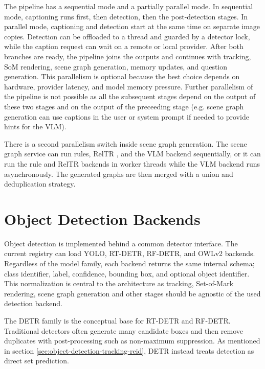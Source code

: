 The pipeline has a sequential mode and a partially parallel mode. In sequential mode, captioning runs first, then detection, then the post-detection stages. In parallel mode, captioning and detection start at the same time on separate image copies. Detection can be offloaded to a thread and guarded by a detector lock, while the caption request can wait on a remote or local provider. After both branches are ready, the pipeline joins the outputs and continues with tracking, SoM rendering, scene graph generation, memory updates, and question generation. This parallelism is optional because the best choice depends on hardware, provider latency, and model memory pressure. Further parallelism of the pipeline is not possible as all the subsequent stages depend on the output of these two stages and on the output of the preceeding stage (e.g. scene graph generation can use captions in the user or system prompt if needed to provide hints for the VLM).

There is a second parallelism switch inside scene graph generation. The scene graph service can run rules, RelTR \cite{cong_reltr_2023}, and the VLM backend sequentially, or it can run the rule and RelTR backends in worker threads while the VLM backend runs asynchronously. The generated graphs are then merged with a union and deduplication strategy. %

\section{Object Detection Backends}\label{sec:server-detection-backends}

Object detection is implemented behind a common detector interface. The current registry can load YOLO, RT-DETR, RF-DETR, and OWLv2 backends. Regardless of the model family, each backend returns the same internal schema; class identifier, label, confidence, bounding box, and optional object identifier. This normalization is central to the architecture as tracking, Set-of-Mark rendering, scene graph generation and other stages should be agnostic of the used detection backend.

The DETR family is the conceptual base for RT-DETR and RF-DETR. Traditional detectors often generate many candidate boxes and then remove duplicates with post-processing such as non-maximum suppression. As mentioned in section \ref{sec:object-detection-tracking-reid}, DETR instead treats detection as direct set prediction.

